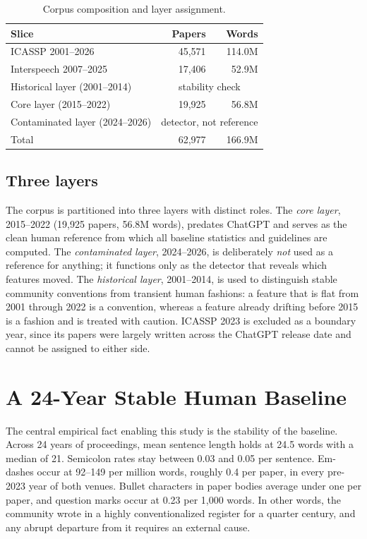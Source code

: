 \documentclass[a4paper,10pt,twocolumn]{article}
\begin{document}
\begin{table}[t]
  \caption{Corpus composition and layer assignment.}
  \label{tab:corpus}
  \centering
  \begin{tabular}{l r r}
    \hline
    \textbf{Slice} & \textbf{Papers} & \textbf{Words} \\
    \hline
    ICASSP 2001--2026        & 45,571 & 114.0M \\
    Interspeech 2007--2025   & 17,406 & 52.9M  \\
    \hline
    Historical layer (2001--2014) & \multicolumn{2}{c}{stability check} \\
    Core layer (2015--2022)  & 19,925 & 56.8M  \\
    Contaminated layer (2024--2026) & \multicolumn{2}{c}{detector, not reference} \\
    \hline
    Total                    & 62,977 & 166.9M \\
    \hline
  \end{tabular}
\end{table}

\subsection{Three layers}

The corpus is partitioned into three layers with distinct roles. The \emph{core layer}, 2015--2022 (19,925 papers, 56.8M words), predates ChatGPT and serves as the clean human reference from which all baseline statistics and guidelines are computed. The \emph{contaminated layer}, 2024--2026, is deliberately \emph{not} used as a reference for anything; it functions only as the detector that reveals which features moved. The \emph{historical layer}, 2001--2014, is used to distinguish stable community conventions from transient human fashions: a feature that is flat from 2001 through 2022 is a convention, whereas a feature already drifting before 2015 is a fashion and is treated with caution. ICASSP 2023 is excluded as a boundary year, since its papers were largely written across the ChatGPT release date and cannot be assigned to either side.

\section{A 24-Year Stable Human Baseline}

The central empirical fact enabling this study is the stability of the baseline. Across 24 years of proceedings, mean sentence length holds at 24.5 words with a median of 21. Semicolon rates stay between 0.03 and 0.05 per sentence. Em-dashes occur at 92--149 per million words, roughly 0.4 per paper, in every pre-2023 year of both venues. Bullet characters in paper bodies average under one per paper, and question marks occur at 0.23 per 1,000 words. In other words, the community wrote in a highly conventionalized register for a quarter century, and any abrupt departure from it requires an external cause.
\end{document}
